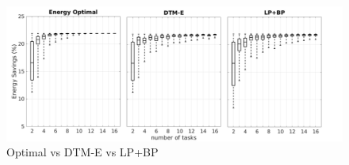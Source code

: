

\begin{figure}[!b]
	\includegraphics[width=\columnwidth]{./figures/opt_DTM_LPBP}
	\caption{Optimal vs DTM-E vs LP+BP}
	\label{fig:comparison}
\end{figure}

